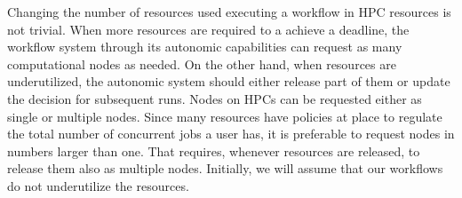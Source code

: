 Changing the number of resources used executing a workflow in HPC resources is not
trivial. When more resources are required to a achieve a deadline, the workflow system
through its autonomic capabilities can request as many computational nodes as needed. 
On the other hand, when resources are underutilized, the autonomic system should either
release part of them or update the decision for subsequent runs. Nodes on HPCs can be
requested either as single or multiple nodes. Since many resources have policies at place
to regulate the total number of concurrent jobs a user has, it is preferable to request
nodes in numbers larger than one. That requires, whenever resources are released, to
release them also as multiple nodes. Initially, we will assume that our workflows do not
underutilize the resources.




